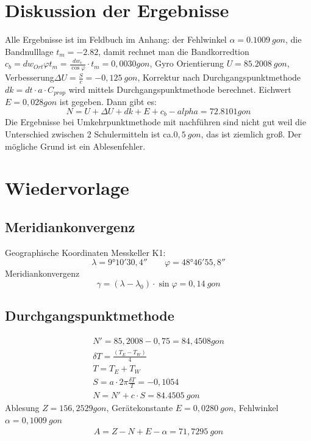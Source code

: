 \documentclass[12pt]{article}
\begin{document}
\section{Diskussion der Ergebnisse}
Alle Ergebnisse ist im Feldbuch im Anhang: der Fehlwinkel $\alpha = 0.1009\ gon$, die Bandnulllage $t_m = -2.82$, damit rechnet man die Bandkorredtion $c_b = dw_{Ort} \varphi t_m = \frac{dw_e}{\cos \varphi} \cdot t_m = 0,0030 gon$, Gyro Orientierung $U = 85.2008\ gon $, Verbesserung$\Delta U = \frac{S}{c} = -0,125\ gon$, Korrektur nach Durchgangspunktmethode $dk = dt \cdot a \cdot C_{prop}$ wird mittels Durchgangspunktmethode berechnet. Eichwert$E = 0,028 gon$ ist gegeben. Dann gibt es:
\begin{equation*}
N = U + \Delta U +dk + E + c_b - alpha = 72.8101 gon
\end{equation*}
Die Ergebnisse bei Umkehrpunktmethode mit nachführen sind nicht gut weil die Unterschied zwischen 2 Schulermitteln ist ca.$0,5\ gon$, das ist ziemlich groß. Der mögliche Grund ist ein Ablesenfehler. 
\newpage
\section{Wiedervorlage}
\subsection{Meridiankonvergenz}
Geographische Koordinaten Messkeller K1:
\begin{equation*}
\lambda = 9°10'30,4'' \quad \quad \varphi = 48°46'55,8''
\end{equation*}
Meridiankonvergenz
\begin{equation*}
\gamma = (\lambda - \lambda_0) \cdot \sin \varphi = 0,14\ gon
\end{equation*}
\subsection{Durchgangspunktmethode}
\begin{gather*}
N' = 85,2008 - 0,75 = 84,4508 gon \\
\delta T = \frac{(T_E - T_W)}{4} \\
T = T_E + T_W \\
S = a \cdot 2\pi \frac{\delta T}{T} = -0,1054\\
N = N' + c \cdot S = 84.4505\ gon
\end{gather*}
Ablesung $Z = 156,2529 gon$, Gerätekonstante $E = 0,0280\ gon$, Fehlwinkel $\alpha = 0,1009 \ gon$
\begin{gather*}
A = Z - N + E - \alpha = 71,7295\ gon \\
\end{gather*}
\end{document}
